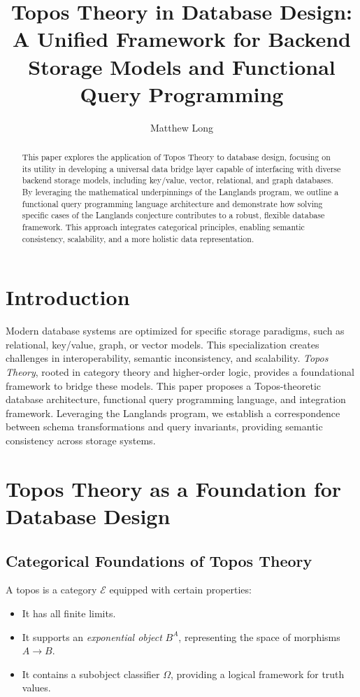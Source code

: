 \documentclass[12pt]{article}
\title{Topos Theory in Database Design: A Unified Framework for Backend Storage Models and Functional Query Programming}
\author{Matthew Long}
\date{}
\begin{document}
\maketitle

\begin{abstract}
This paper explores the application of Topos Theory to database design, focusing on its utility in developing a universal data bridge layer capable of interfacing with diverse backend storage models, including key/value, vector, relational, and graph databases. By leveraging the mathematical underpinnings of the Langlands program, we outline a functional query programming language architecture and demonstrate how solving specific cases of the Langlands conjecture contributes to a robust, flexible database framework. This approach integrates categorical principles, enabling semantic consistency, scalability, and a more holistic data representation.
\end{abstract}

\section{Introduction}
Modern database systems are optimized for specific storage paradigms, such as relational, key/value, graph, or vector models. This specialization creates challenges in interoperability, semantic inconsistency, and scalability. \emph{Topos Theory}, rooted in category theory and higher-order logic, provides a foundational framework to bridge these models. This paper proposes a Topos-theoretic database architecture, functional query programming language, and integration framework. Leveraging the Langlands program, we establish a correspondence between schema transformations and query invariants, providing semantic consistency across storage systems.

\section{Topos Theory as a Foundation for Database Design}

\subsection{Categorical Foundations of Topos Theory}
A topos is a category $\mathcal{E}$ equipped with certain properties:
\begin{itemize}
    \item It has all finite limits.
    \item It supports an \emph{exponential object} $B^A$, representing the space of morphisms $A \to B$.
    \item It contains a subobject classifier $\Omega$, providing a logical framework for truth values.
\end{itemize}
\end{document}
